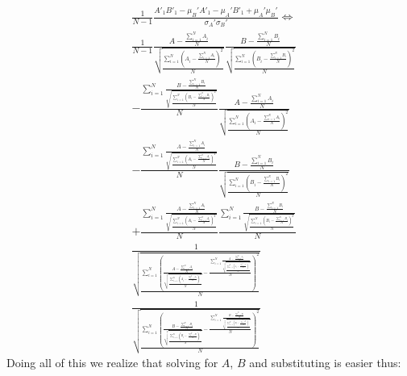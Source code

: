 \documentclass[12pt, a4paper]{article}
\begin{document}
\begin{equation*}
    \begin{split}
        & \frac{1}{N-1} \frac{A'_1B'_1 -\mu_B'A'_1 -\mu_A'B'_1 +\mu_A'\mu_B'}{\sigma_A'\sigma_B'} \iff \\
        & \frac{1}{N-1} \frac{A-\frac{\sum_{i=1}^{N}{A_i}}{N}}{\sqrt{\frac{\sum_{i=1}^{N}{\left(A_i-\frac{\sum_{i=1}^{N}{A_i}}{N}\right)^2}}{N}}} \frac{B-\frac{\sum_{i=1}^{N}{B_i}}{N}}{\sqrt{\frac{\sum_{i=1}^{N}{\left(B_i-\frac{\sum_{i=1}^{N}{B_i}}{N}\right)^2}}{N}}} \\
        & -\frac{\sum_{i=1}^{N}{\frac{B-\frac{\sum_{i=1}^{N}{B_i}}{N}}{\sqrt{\frac{\sum_{i=1}^{N}{\left(B_i-\frac{\sum_{i=1}^{N}{B_i}}{N}\right)^2}}{N}}}}}{N} \frac{A-\frac{\sum_{i=1}^{N}{A_i}}{N}}{\sqrt{\frac{\sum_{i=1}^{N}{\left(A_i-\frac{\sum_{i=1}^{N}{A_i}}{N}\right)^2}}{N}}} \\
        & -\frac{\sum_{i=1}^{N}{\frac{A-\frac{\sum_{i=1}^{N}{A_i}}{N}}{\sqrt{\frac{\sum_{i=1}^{N}{\left(A_i-\frac{\sum_{i=1}^{N}{A_i}}{N}\right)^2}}{N}}}}}{N}\frac{B-\frac{\sum_{i=1}^{N}{B_i}}{N}}{\sqrt{\frac{\sum_{i=1}^{N}{\left(B_i-\frac{\sum_{i=1}^{N}{B_i}}{N}\right)^2}}{N}}} \\
        & +\frac{\sum_{i=1}^{N}{\frac{A-\frac{\sum_{i=1}^{N}{A_i}}{N}}{\sqrt{\frac{\sum_{i=1}^{N}{\left(A_i-\frac{\sum_{i=1}^{N}{A_i}}{N}\right)^2}}{N}}}}}{N} \frac{\sum_{i=1}^{N}{\frac{B-\frac{\sum_{i=1}^{N}{B_i}}{N}}{\sqrt{\frac{\sum_{i=1}^{N}{\left(B_i-\frac{\sum_{i=1}^{N}{B_i}}{N}\right)^2}}{N}}}}}{N} \\
        & \frac{1}{\sqrt{\frac{\sum_{i=1}^{N}{\left(\frac{A-\frac{\sum_{i=1}^{N}{A_i}}{N}}{\sqrt{\frac{\sum_{i=1}^{N}{\left(A_i-\frac{\sum_{i=1}^{N}{A_i}}{N}\right)^2}}{N}}}-\frac{\sum_{i=1}^{N}{\frac{A-\frac{\sum_{i=1}^{N}{A_i}}{N}}{\sqrt{\frac{\sum_{i=1}^{N}{\left(A_i-\frac{\sum_{i=1}^{N}{A_i}}{N}\right)^2}}{N}}}}}{N}\right)^2}}{N}}  } \\
        & \frac{1}{\sqrt{\frac{\sum_{i=1}^{N}{\left(\frac{B-\frac{\sum_{i=1}^{N}{B_i}}{N}}{\sqrt{\frac{\sum_{i=1}^{N}{\left(B_i-\frac{\sum_{i=1}^{N}{B_i}}{N}\right)^2}}{N}}}-\frac{\sum_{i=1}^{N}{\frac{B-\frac{\sum_{i=1}^{N}{B_i}}{N}}{\sqrt{\frac{\sum_{i=1}^{N}{\left(B_i-\frac{\sum_{i=1}^{N}{B_i}}{N}\right)^2}}{N}}}}}{N}\right)^2}}{N}}}
    \end{split}
\end{equation*}
Doing all of this we realize that solving for $A$, $B$ and substituting is easier thus:
\end{document}
